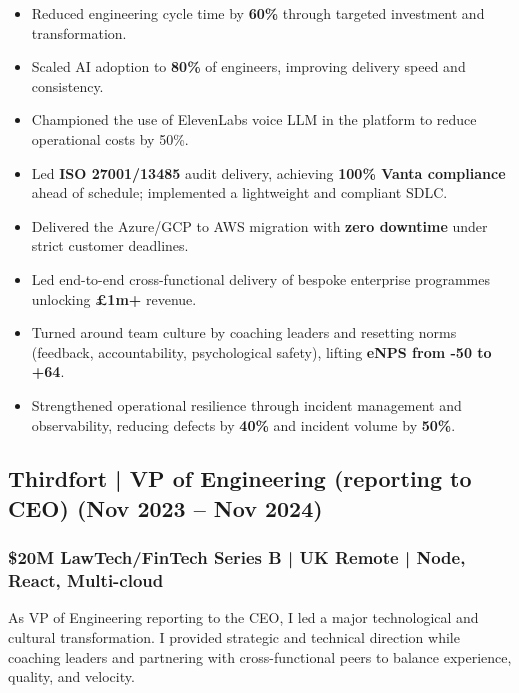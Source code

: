 \documentclass[12pt]{article}
\begin{document}
\begin{itemize}
  \item Reduced engineering cycle time by \textbf{60\%} through targeted investment and transformation.
  \item Scaled AI adoption to \textbf{80\%} of engineers, improving delivery speed and consistency.
  \item Championed the use of ElevenLabs voice LLM in the platform to reduce operational costs by 50\%.
  \item Led \textbf{ISO 27001/13485} audit delivery, achieving \textbf{100\% Vanta compliance} ahead of schedule; implemented a lightweight and compliant SDLC.
  \item Delivered the Azure/GCP to AWS migration with \textbf{zero downtime} under strict customer deadlines.
  \item Led end-to-end cross-functional delivery of bespoke enterprise programmes unlocking \textbf{\pounds1m+} revenue.
  \item Turned around team culture by coaching leaders and resetting norms (feedback, accountability, psychological safety), lifting \textbf{eNPS from -50 to +64}.
  \item Strengthened operational resilience through incident management and observability, reducing defects by \textbf{40\%} and incident volume by \textbf{50\%}.
\end{itemize}

\subsection*{Thirdfort | VP of Engineering (reporting to CEO) \small (Nov 2023 -- Nov 2024)}
\subsubsection*{\$20M LawTech/FinTech Series B | UK Remote | Node, React, Multi-cloud}

As VP of Engineering reporting to the CEO, I led a major technological and cultural transformation. I provided strategic and technical direction while coaching leaders and partnering with cross-functional peers to balance experience, quality, and velocity.
\end{document}

